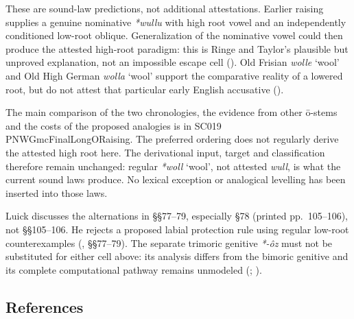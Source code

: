 \documentclass[
  british,
  a4paper,
]{article}
\providecommand{\Recon}[1]{\emph{*#1}}
\begin{document}
These are sound-law predictions, not additional attestations. Earlier
raising supplies a genuine nominative \emph{*wullu} with high root vowel
and an independently conditioned low-root oblique. Generalization of the
nominative vowel could then produce the attested high-root paradigm:
this is Ringe and Taylor's plausible but unproved explanation, not an
impossible escape cell (). Old Frisian {\emph{wolle}} `wool' and Old High German
{\emph{wolla}} `wool' support the comparative reality of a lowered root,
but do not attest that particular early English accusative
().

The main comparison of the two chronologies, the evidence from other
ō-stems and the costs of the proposed analogies is in SC019
PNWGmcFinalLongORaising. The preferred ordering does not regularly
derive the attested high root here. The derivational input, target and
classification therefore remain unchanged: regular \Recon{woll} `wool',
not attested \emph{wull}, is what the current sound laws produce. No
lexical exception or analogical levelling has been inserted into those
laws.

Luick discusses the alternations in §§77--79, especially §78 (printed
pp.~105--106), not §§105--106. He rejects a proposed labial protection
rule using regular low-root counterexamples
(, §§77--79). The
separate trimoric genitive \emph{*-ôz} must not be substituted for
either cell above: its analysis differs from the bimoric genitive and
its complete computational pathway remains unmodeled
(;
).

\clearpage

\subsection*{References}\label{references}
\end{document}

